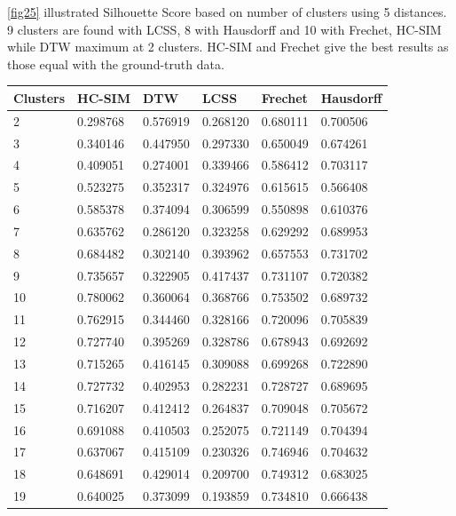 \documentclass[a4paper, 12pt]{article}
\begin{document}
\pagebreak

\autoref{fig25} illustrated Silhouette Score based on number of clusters using 5 distances. 9 clusters are found with LCSS, 8 with Hausdorff and 10 with Frechet, HC-SIM while DTW maximum at 2 clusters. HC-SIM and Frechet give the best results as those equal with the ground-truth data.

\begin{tabularx}{\linewidth}{|X|X|X|X|X|X|}
    \caption{Mopsi Silhouette Scores} \\
    \hline \textbf{Clusters} & \textbf{HC-SIM} & \textbf{DTW} & \textbf{LCSS} & \textbf{Frechet} & \textbf{Hausdorff} \\
    \hline
    \hline
        2 & 0.298768 & 0.576919 & 0.268120 & 0.680111 & 0.700506 \\
        3 & 0.340146 & 0.447950 & 0.297330 & 0.650049 & 0.674261 \\
        4 & 0.409051 & 0.274001 & 0.339466 & 0.586412 & 0.703117 \\
        5 & 0.523275 & 0.352317 & 0.324976 & 0.615615 & 0.566408 \\
        6 & 0.585378 & 0.374094 & 0.306599 & 0.550898 & 0.610376 \\
        7 & 0.635762 & 0.286120 & 0.323258 & 0.629292 & 0.689953 \\
        8 & 0.684482 & 0.302140 & 0.393962 & 0.657553 & 0.731702 \\
        9 & 0.735657 & 0.322905 & 0.417437 & 0.731107 & 0.720382 \\
        10 & 0.780062 & 0.360064 & 0.368766 & 0.753502 & 0.689732 \\
        11 & 0.762915 & 0.344460 & 0.328166 & 0.720096 & 0.705839 \\
        12 & 0.727740 & 0.395269 & 0.328786 & 0.678943 & 0.692692 \\
        13 & 0.715265 & 0.416145 & 0.309088 & 0.699268 & 0.722890 \\
        14 & 0.727732 & 0.402953 & 0.282231 & 0.728727 & 0.689695 \\
        15 & 0.716207 & 0.412412 & 0.264837 & 0.709048 & 0.705672 \\
        16 & 0.691088 & 0.410503 & 0.252075 & 0.721149 & 0.704394 \\
        17 & 0.637067 & 0.415109 & 0.230326 & 0.746946 & 0.704632 \\
        18 & 0.648691 & 0.429014 & 0.209700 & 0.749312 & 0.683025 \\
        19 & 0.640025 & 0.373099 & 0.193859 & 0.734810 & 0.666438 \\

\end{tabularx}
\end{document}
